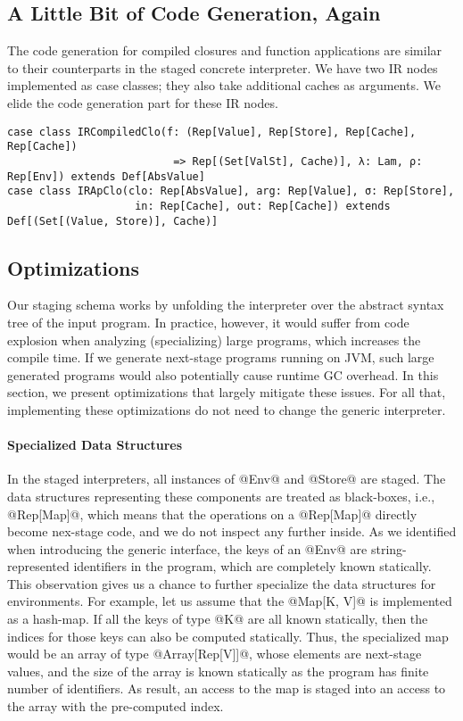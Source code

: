 \subsection{A Little Bit of Code Generation, Again}
The code generation for compiled closures and function applications are similar
to their counterparts in the staged concrete interpreter. We have two IR nodes
implemented as case classes; they also take additional caches as arguments. We
elide the code generation part for these IR nodes.
\begin{lstlisting}
case class IRCompiledClo(f: (Rep[Value], Rep[Store], Rep[Cache], Rep[Cache])
                          => Rep[(Set[ValSt], Cache)], λ: Lam, ρ: Rep[Env]) extends Def[AbsValue]
case class IRApClo(clo: Rep[AbsValue], arg: Rep[Value], σ: Rep[Store],
                    in: Rep[Cache], out: Rep[Cache]) extends Def[(Set[(Value, Store)], Cache)]
\end{lstlisting}

\subsection{Optimizations} \label{staged_ds}

Our staging schema works by unfolding the interpreter over the abstract syntax
tree of the input program. In practice, however, it would suffer from code
explosion when analyzing (specializing) large programs, which increases the
compile time. If we generate next-stage programs running on JVM, such large
generated programs would also potentially cause runtime GC overhead. In this
section, we present optimizations that largely mitigate these issues. For all
that, implementing these optimizations do not need to change the generic
interpreter.

\paragraph{Specialized Data Structures}

In the staged interpreters, all instances of @Env@ and @Store@ are staged. The
data structures representing these components are treated as black-boxes, i.e.,
@Rep[Map]@, which means that the operations on a @Rep[Map]@ directly become
nex-stage code, and we do not inspect any further inside. As we identified when
introducing the generic interface, the keys of an @Env@ are string-represented
identifiers in the program, which are completely known statically. This
observation gives us a chance to further specialize the data structures for environments.
For example, let us assume that the @Map[K, V]@ is implemented as a hash-map.
If all the keys of type @K@ are all known statically, then the indices for
those keys can also be computed statically. Thus, the specialized map would be
an array of type @Array[Rep[V]]@, whose elements are next-stage values, and the
size of the array is known statically as the program has finite number of
identifiers. As result, an access to the map is staged into an access to the array
with the pre-computed index.


